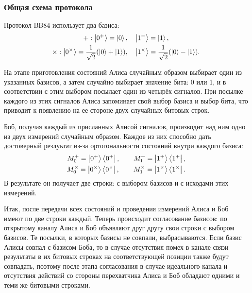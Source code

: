 \subsubsection{Общая схема протокола}
Протокол BB84 \cite{bb84} использует два базиса:
\begin{gather}
  +: \left| 0^+ \right\rangle = \left| 0 \right\rangle,\quad \left| 1^+ \right\rangle = \left| 1 \right\rangle, \nonumber\\
  \times: \left| 0^\times \right\rangle = \frac{1}{\sqrt{2}}(\left| 0 \right\rangle + \left| 1 \right\rangle),\quad \left| 1^\times \right\rangle = \frac{1}{\sqrt{2}}(\left| 0 \right\rangle - \left| 1 \right\rangle).
\end{gather}

На этапе приготовления состояний Алиса случайным образом выбирает один из указанных базисов, а затем случайно выбирает значение бита: 0 или 1, и в соответствии с этим выбором посылает один из четырёх сигналов. При посылке каждого из этих сигналов Алиса запоминает свой выбор базиса и выбор бита, что приводит к появлению на ее стороне двух случайных битовых строк.

Боб, получая каждый из присланных Алисой сигналов, производит над ним одно из двух измерений случайным образом. Каждое из них способно дать достоверный резлуьтат из-за ортогональности состояний внутри каждого базиса:
\begin{eqnarray}\label{bb84_bob_measurements}
  M_0^+ = \left| 0^+ \right\rangle\left\langle 0^+ \right|, \qquad M_1^+ = \left| 1^+ \right\rangle\left\langle 1^+ \right|, \nonumber\\
  M_0^\times = \left| 0^\times \right\rangle\left\langle 0^\times \right|, \qquad M_1^\times = \left| 1^\times \right\rangle\left\langle 1^\times \right|.
\end{eqnarray}
В результате он получает две строки: с выбором базисов и с исходами этих измерений.

Итак, после передачи всех состояний и проведения измерений Алиса и Боб имеют по две строки каждый. Теперь происходит согласование базисов: по открытому каналу Алиса и Боб объявляют друг другу свои строки с выбором базисов. Те посылки, в которых базисы не совпали, выбрасываются. Если базис Алисы совпал с базисом Боба, то в случае отсутствия помех в канале связи результаты в их битовых строках на соответствующей позиции также будут совпадать, поэтому после этапа согласования в случае идеального канала и отсутствия действий со стороны перехватчика Алиса и Боб обладают одними и теми же битовыми строками.

